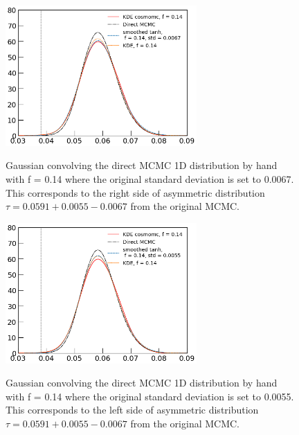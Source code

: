 \documentclass[prd,amsmath,amssymb,floatfix,superscriptaddress,nofootinbib]{revtex4-1}
\begin{document}
\begin{figure}
\includegraphics[width=0.65\textwidth]{cosmomc_kde/getdist_smoothing_test/pl18_relike_tanh_tau_dz0p5_1D_gauss_smoothed_tanh_std_0p0067.png}
\label{fig:}
\caption{Gaussian convolving the direct MCMC 1D distribution by hand with f = 0.14 where the original standard deviation is set to 0.0067. This corresponds to the right side of asymmetric distribution $\tau = 0.0591 + 0.0055 - 0.0067$ from the original MCMC.
} 
\end{figure}


\begin{figure}
\includegraphics[width=0.65\textwidth]{cosmomc_kde/getdist_smoothing_test/pl18_relike_tanh_tau_dz0p5_1D_gauss_smoothed_tanh_std_0p0055.png}
\label{fig:}
\caption{Gaussian convolving the direct MCMC 1D distribution by hand with f = 0.14 where the original standard deviation is set to 0.0055. This corresponds to the left side of asymmetric distribution $\tau = 0.0591 + 0.0055 - 0.0067$ from the original MCMC.
} 
\end{figure}
\end{document}
